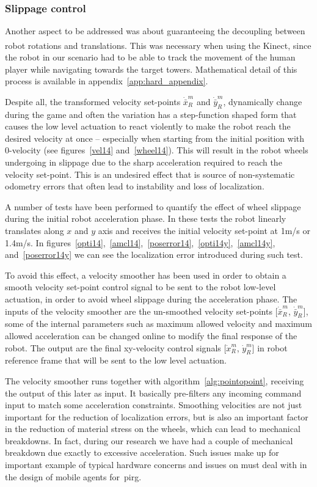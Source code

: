 \subsubsection{Slippage control} \label{sec:slippage}
Another aspect to be addressed was about guaranteeing the decoupling between robot rotations and translations. 
This was necessary when using the Kinect\textsuperscript{\textregistered}, since the robot in our scenario had to be able to track the movement of the human player while navigating towards the target towers. Mathematical detail of this process is available in appendix~\ref{app:hard_appendix}. 

Despite all, the transformed velocity set-points $\dot{\bar{x}}_R^m$ and $\dot{\bar{y}}_R^m$, dynamically change during the game and often the variation has a step-function shaped form that causes the low level actuation to react violently to make the robot reach the desired velocity at once -- especially when starting from the initial position with 0-velocity (see figures~\ref{vel14} and~\ref{wheel14}). This will result in the robot wheels undergoing in slippage due to the sharp acceleration required to reach the velocity set-point. This is an undesired effect that is source of non-systematic odometry errors that often lead to instability and loss of localization. 

A number of tests have been performed to quantify the effect of wheel slippage during the initial robot acceleration phase. In these tests the robot linearly translates along $x$ and $y$ axis and receives the initial velocity set-point at 1m/s or 1.4m/s. In figures~\ref{opti14},~\ref{amcl14},~\ref{poserror14},~\ref{opti14y},~\ref{amcl14y}, and~\ref{poserror14y} we can see the localization error introduced during such test.

To avoid this effect, a velocity smoother has been used in order to obtain a smooth velocity set-point control signal to be sent to the robot low-level actuation, in order to avoid wheel slippage during the acceleration phase. The inputs of the velocity smoother are the un-smoothed velocity set-points [$\dot{\bar{x}}_R^m$, $\dot{\bar{y}}_R^m$], some of the internal parameters such as maximum allowed velocity and maximum allowed acceleration can be changed online to modify the final response of the robot. The output are the final xy-velocity control signals [$\dot{x}_R^m$, $\dot{y}_R^m$] in robot reference frame that will be sent to the low level actuation.

The velocity smoother runs together with algorithm~\ref{alg:pointopoint}, receiving the output of this later as input. It basically pre-filters any incoming command input to match some acceleration constraints. Smoothing velocities are not just important for the reduction of localization errors, but is also an important factor in the reduction of material stress on the wheels, which can lead to mechanical breakdowns. In fact, during our research we have had a couple of mechanical breakdown due exactly to excessive acceleration. Such issues make up for important example of typical hardware concerns and issues on must deal with in the design of mobile agents for~\gls{pirg}.

